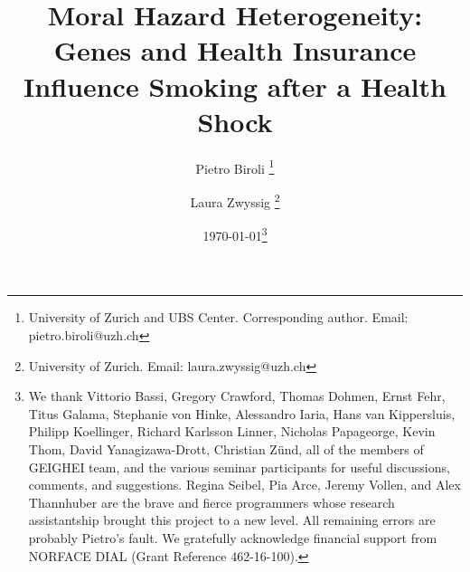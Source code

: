 \documentclass[11pt]{article}
\begin{document}
\title{
Moral Hazard Heterogeneity: \\ Genes and Health Insurance Influence Smoking after a Health Shock
%
}

\author{
Pietro Biroli \thanks{University of Zurich and UBS Center. Corresponding author. {Email: pietro.biroli@uzh.ch}}
\and
Laura Zwyssig \thanks{
University of Zurich. {Email: laura.zwyssig@uzh.ch}}
}

\date{
\today \thanks{
We thank
Vittorio Bassi,
Gregory Crawford,
Thomas Dohmen,
Ernst Fehr,
Titus Galama,
Stephanie von Hinke,
Alessandro Iaria,
Hans van Kippersluis,
Philipp Koellinger,
Richard Karlsson Linner,
Nicholas Papageorge,
Kevin Thom,
David Yanagizawa-Drott,
Christian Z\"und,
all of the members of GEIGHEI team, and the various seminar participants for useful discussions, comments, and suggestions.
Regina Seibel, Pia Arce, Jeremy Vollen, and Alex Thannhuber are the brave and fierce programmers whose research assistantship brought this project to a new level.
All remaining errors are probably Pietro's fault.
We gratefully acknowledge financial support from NORFACE DIAL (Grant Reference 462-16-100).
} %
} %

\maketitle
\end{document}
